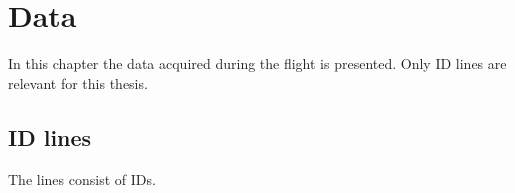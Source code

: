 \chapter{Data \label{ch:data}}
In this chapter the data acquired during the flight is presented. Only ID lines are relevant for this thesis.

\section{ID lines \label{sec:id_lines}}
The lines consist of IDs.